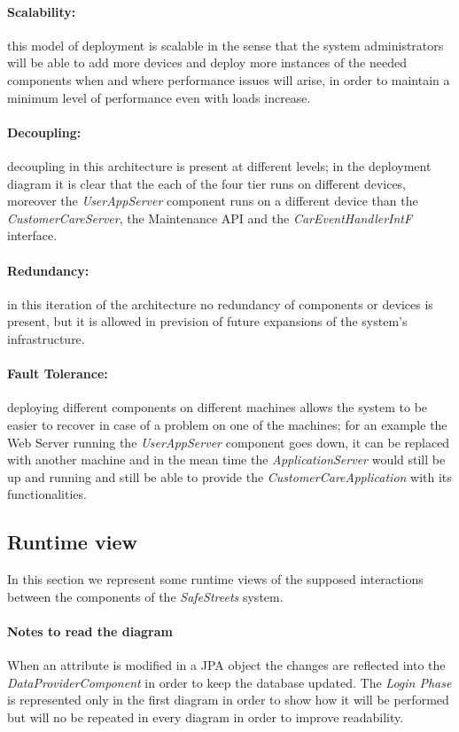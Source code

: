 \paragraph{Scalability:}this model of deployment is scalable in the sense that the system administrators will be able to add more devices and deploy more instances of the needed components when and where performance issues will arise, in order to maintain a minimum level of performance even with loads increase.
\paragraph{Decoupling:}decoupling in this architecture is present at different levels; in the deployment diagram it is clear that the each of the four tier runs on different devices, moreover the \emph{UserAppServer} component runs on a different device than the \emph{CustomerCareServer}, the Maintenance API and the \textit{CarEventHandlerIntF} interface.
\paragraph{Redundancy:}in this iteration of the architecture no redundancy of components or devices is present, but it is allowed in prevision of future expansions of the system's infrastructure.
\paragraph{Fault Tolerance:}deploying different components on different machines allows the system to be easier to recover in case of a problem on one of the machines; for an example the Web Server running the \textit{UserAppServer} component goes down, it can be replaced with another machine and in the mean time the \textit{ApplicationServer} would still be up and running and still be able to provide the \textit{CustomerCareApplication} with its functionalities.

\clearpage
\subsection{Runtime view}
In this section we represent some runtime views of the supposed interactions between the components of the \emph{SafeStreets} system.

\paragraph{Notes to read the diagram} When an attribute is modified in a JPA object the changes are reflected into the
	\emph{DataProviderComponent} in order to keep the database updated. 	The \emph{Login Phase} is represented only in the first diagram in order to show how it will be performed but will no be 
	repeated in every diagram in order to improve readability.

